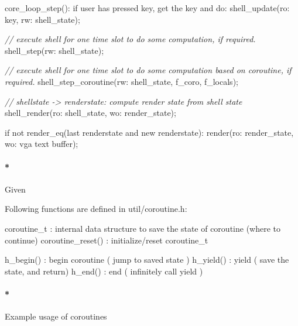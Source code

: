 \documentclass[]{article}
\newenvironment{Shaded}{}{}
\newcommand{\CommentTok}[1]{\textcolor[rgb]{0.50,0.50,0.50}{\textit{{#1}}}}
\newcommand{\ControlFlowTok}[1]{{#1}}
\newcommand{\NormalTok}[1]{{#1}}
\let\oldparagraph\paragraph
\renewcommand{\paragraph}[1]{\oldparagraph{#1}\mbox{}}
\begin{document}
\begin{Shaded}
\begin{Highlighting}[]
   \NormalTok{core_loop_step():}
       \ControlFlowTok{if} \NormalTok{user has pressed key, get the key and }\ControlFlowTok{do}\NormalTok{:}
           \NormalTok{shell_update(ro: key, rw: shell_state);}

       \CommentTok{// execute shell for one time slot to do some computation, if required.}
       \NormalTok{shell_step(rw: shell_state);}

       \CommentTok{// execute shell for one time slot to do some computation based on coroutine, if required.}
       \NormalTok{shell_step_coroutine(rw: shell_state, f_coro, f_locals);}

       \CommentTok{// shellstate -> renderstate: compute render state from shell state}
       \NormalTok{shell_render(ro: shell_state, wo: render_state);}

       \ControlFlowTok{if} \NormalTok{not render_eq(last renderstate and new renderstate):}
           \NormalTok{render(ro: render_state, wo: vga text buffer);}
\end{Highlighting}
\end{Shaded}

\paragraph*{Given}\label{given-4}

Following functions are defined in util/coroutine.h:

\begin{Shaded}
\begin{Highlighting}[]
    \NormalTok{coroutine_t        : internal data structure to save the state of coroutine (where to }\ControlFlowTok{continue}\NormalTok{)}
    \NormalTok{coroutine_reset()  : initialize/reset coroutine_t}

    \NormalTok{h_begin()          : begin coroutine ( jump to saved state )}
    \NormalTok{h_yield()          : yield           ( save the state, and }\ControlFlowTok{return}\NormalTok{)}
    \NormalTok{h_end()            : end             ( infinitely call yield )}
\end{Highlighting}
\end{Shaded}

\paragraph*{Example usage of
coroutines}\label{example-usage-of-coroutines}
\end{document}
